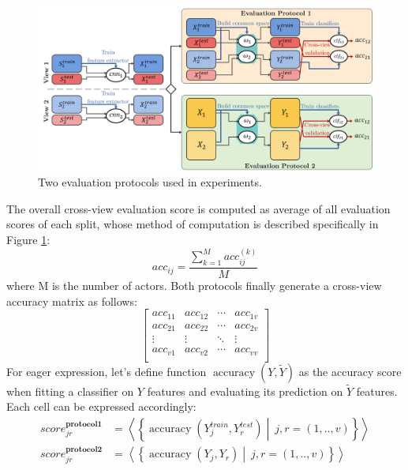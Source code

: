     \begin{figure}[htbp]
      \centering
      \includegraphics[width=1\linewidth]{figs/protocol.png}
      \caption{Two evaluation protocols used in experiments.}
      \label{Fig:ep}
    \end{figure}
    The overall cross-view evaluation score is computed as average of all evaluation scores of each split, whose method of computation is described specifically in Figure \ref{Fig:ep}:
    \begin{equation}
        {acc}_{ij} = \frac{\sum_{k=1}^M {acc}^{(k)}_{ij}}{M}
    \end{equation}
    where M is the number of actors. Both protocols finally generate a cross-view accuracy matrix as follows:
    \begin{equation}
        \left[\begin{matrix}{acc}_{11}&{acc}_{12}&\cdots&{acc}_{1v}\\{acc}_{21}&{acc}_{22}&\cdots&{acc}_{2v}\\\vdots&\vdots&\ddots&\vdots\\{acc}_{v1}&{acc}_{v2}&\cdots&{acc}_{vv}\\\end{matrix}\right]
        \label{eq:multiview_scores}
    \end{equation}
    For eager expression, let's define function $\operatorname{accuracy}\left(Y, \tilde{Y}\right)$ as the accuracy score when fitting a classifier on $Y$ features and evaluating its prediction on $\tilde{Y}$ features. Each cell can be expressed accordingly:
    \begin{align}
        {score}_{jr}^{\boldsymbol{protocol 1}} & =\left<\left\{\operatorname{accuracy}\left(Y_j^{train},Y_r^{test}\right)\middle|\ j,r=(1,..,v)\right\}\right> \\
        {score}_{jr}^{\boldsymbol{protocol 2}} & =\left<\left\{\operatorname{accuracy}\left(Y_j,Y_r\right)\middle|\ j,r=(1,..,v)\right\}\right>
    \end{align}


